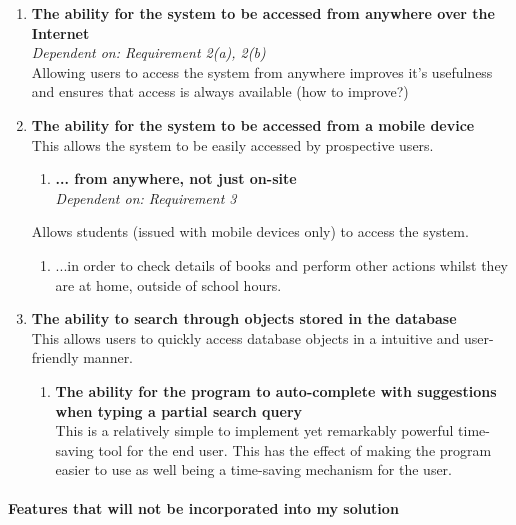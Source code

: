 \documentclass[../../../main.tex]{subfiles}
\begin{document}
\begin{enumerate}
    \item \textbf{The ability for the system to be accessed from anywhere over the Internet}\\
          \textit{Dependent on: Requirement 2(a), 2(b)}\\
          Allowing users to access the system from anywhere improves it's usefulness and ensures that access is always available (how to improve?)

    \item \textbf{The ability for the system to be accessed from a mobile device}\\
          This allows the system to be  easily accessed by prospective users.\\
          \begin{enumerate}
              \item \textbf{... from anywhere, not just on-site}\\
                    \textit{Dependent on: Requirement 3}
          \end{enumerate}


          Allows students (issued with mobile devices only) to access the system.
          \begin{enumerate}
              \item ...in order to check details of books and perform other actions whilst they are at home, outside of school hours.
          \end{enumerate}

    \item \textbf{The ability to search through objects stored in the database}\\
          This allows users to quickly access database objects in a intuitive and user-friendly manner.

          \begin{enumerate}
              \item \textbf{The ability for the program to auto-complete with suggestions when typing a partial search query}\\
                    This is a relatively simple to implement yet remarkably powerful time-saving tool for the end user.
                    This has the effect of making the program easier to use as well being a time-saving mechanism for the user.
          \end{enumerate}
\end{enumerate}

\paragraph{Features that will not be incorporated into my solution}
\end{document}

